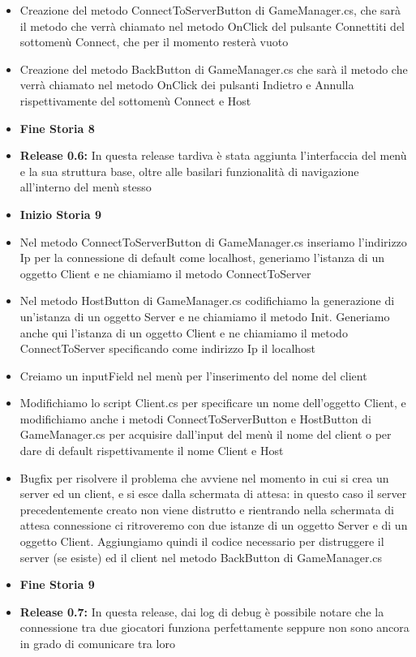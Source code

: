 \documentclass[12pt]{article}
\begin{document}
\begin{itemize}
\begin{itemize}
	\item Creazione del metodo ConnectToServerButton di GameManager.cs, che sarà il metodo che verrà chiamato nel metodo OnClick del pulsante Connettiti del sottomenù Connect, che per il momento resterà vuoto
	\item Creazione del metodo BackButton di GameManager.cs che sarà il metodo che verrà chiamato nel metodo OnClick dei pulsanti Indietro e Annulla rispettivamente del sottomenù Connect e Host
	\item \textbf{Fine Storia 8}
	\item \textbf{Release 0.6:} In questa release tardiva è stata aggiunta l'interfaccia del menù e la sua struttura base, oltre alle basilari funzionalità di navigazione all'interno del menù stesso
	\item \textbf{Inizio Storia 9}
	\item Nel metodo ConnectToServerButton di GameManager.cs inseriamo l'indirizzo Ip per la connessione di default come localhost, generiamo l'istanza di un oggetto Client e ne chiamiamo il metodo ConnectToServer
	\item Nel metodo HostButton di GameManager.cs codifichiamo la generazione di un'istanza di un oggetto Server e ne chiamiamo il metodo Init. Generiamo anche qui l'istanza di un oggetto Client e ne chiamiamo il metodo ConnectToServer specificando come indirizzo Ip il localhost
	\item Creiamo un inputField nel menù per l'inserimento del nome del client
	\item Modifichiamo lo script Client.cs per specificare un nome dell'oggetto Client, e modifichiamo anche i metodi ConnectToServerButton e HostButton di GameManager.cs per acquisire dall'input del menù il nome del client o per dare di default rispettivamente il nome Client e Host
	\item Bugfix per risolvere il problema che avviene nel momento in cui si crea un server ed un client, e si esce dalla schermata di attesa: in questo caso il server precedentemente creato non viene distrutto e rientrando nella schermata di attesa connessione ci ritroveremo con due istanze di un oggetto Server e di un oggetto Client. Aggiungiamo quindi il codice necessario per distruggere il server (se esiste) ed il client nel metodo BackButton di GameManager.cs
	\item \textbf{Fine Storia 9}
	\item \textbf{Release 0.7:} In questa release, dai log di debug è possibile notare che la connessione tra due giocatori funziona perfettamente seppure non sono ancora in grado di comunicare tra loro

\end{itemize}
\end{itemize}
\end{document}
